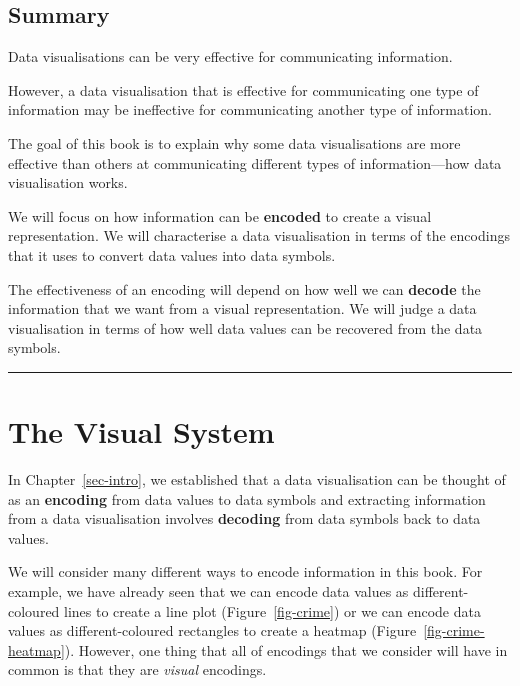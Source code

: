 \documentclass[
  letterpaper,
  DIV=11,
  numbers=noendperiod]{scrreprt}
\begin{document}
\section{Summary}\label{summary}

Data visualisations can be very effective for communicating information.

However, a data visualisation that is effective for communicating one
type of information may be ineffective for communicating another type of
information.

The goal of this book is to explain why some data visualisations are
more effective than others at communicating different types of
information---how data visualisation works.

We will focus on how information can be \textbf{encoded} to create a
visual representation. We will characterise a data visualisation in
terms of the encodings that it uses to convert data values into data
symbols.

The effectiveness of an encoding will depend on how well we can
\textbf{decode} the information that we want from a visual
representation. We will judge a data visualisation in terms of how well
data values can be recovered from the data symbols.

\begin{center}\rule{0.5\linewidth}{0.5pt}\end{center}

\theendnotes


\chapter{The Visual System}\label{sec-visual-system}

In Chapter~\ref{sec-intro}, we established that a data visualisation can
be thought of as an \textbf{encoding} from data values to data symbols
and extracting information from a data visualisation involves
\textbf{decoding} from data symbols back to data values.

We will consider many different ways to encode information in this book.
For example, we have already seen that we can encode data values as
different-coloured lines to create a line plot (Figure~\ref{fig-crime})
or we can encode data values as different-coloured rectangles to create
a heatmap (Figure~\ref{fig-crime-heatmap}). However, one thing that all
of encodings that we consider will have in common is that they are
\emph{visual} encodings.
\end{document}
